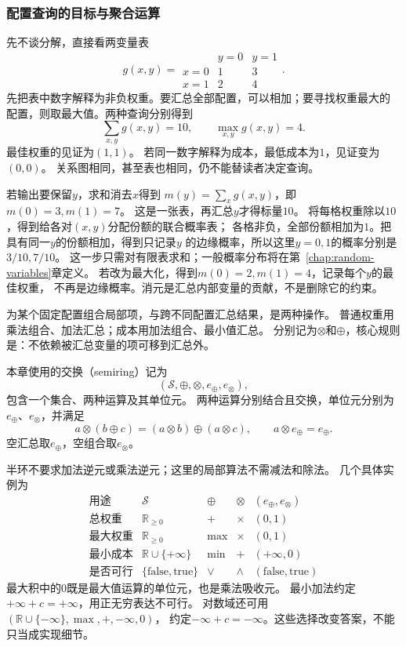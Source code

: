 \subsubsection{配置查询的目标与聚合运算}

先不谈分解，直接看两变量表
\[
  g(x,y)=
  \begin{array}{c|cc}
    &y=0&y=1\\ \hline
    x=0&1&3\\
    x=1&2&4
  \end{array}.
\]
先把表中数字解释为非负权重。要汇总全部配置，可以相加；要寻找权重最大的
配置，则取最大值。两种查询分别得到
\[
  \sum_{x,y}g(x,y)=10,\qquad \max_{x,y}g(x,y)=4.
\]
最佳权重的见证为\((1,1)\)。
若同一数字解释为成本，最低成本为\(1\)，见证变为\((0,0)\)。
关系图相同，甚至表也相同，仍不能替读者决定查询。

若输出要保留\(y\)，求和消去\(x\)得到
\(m(y)=\sum_xg(x,y)\)，即\(m(0)=3,m(1)=7\)。
这是一张表，再汇总\(y\)才得标量\(10\)。
将每格权重除以\(10\)，得到给各对\((x,y)\)分配份额的联合概率表；
各格非负，全部份额相加为\(1\)。把具有同一\(y\)的份额相加，得到只记录\(y\)
的边缘概率，所以这里\(y=0,1\)的概率分别是\(3/10,7/10\)。
这一步只需对有限表求和；一般概率分布将在第~\ref{chap:random-variables}章定义。
若改为最大化，得到\(m(0)=2,m(1)=4\)，记录每个\(y\)的最佳权重，
不再是边缘概率。消元是汇总内部变量的贡献，不是删除它的约束。

为某个固定配置组合局部项，与跨不同配置汇总结果，是两种操作。
普通权重用乘法组合、加法汇总；成本用加法组合、最小值汇总。
分别记为\(\otimes\)和\(\oplus\)，核心规则是：不依赖被汇总变量的项可移到汇总外。

\begin{definition}[交换半环]
  \label{def:graph-theory-semiring}
  本章使用的交换（semiring）记为
  \[
    (\mathcal S,\oplus,\otimes,e_{\oplus},e_{\otimes}),
  \]
  包含一个集合、两种运算及其单位元。
  两种运算分别结合且交换，单位元分别为\(e_{\oplus}\)、\(e_{\otimes}\)，并满足
  \[
    a\otimes(b\oplus c)=(a\otimes b)\oplus(a\otimes c),\qquad
    a\otimes e_{\oplus}=e_{\oplus}.
  \]
  空汇总取\(e_{\oplus}\)，空组合取\(e_{\otimes}\)。
\end{definition}

半环不要求加法逆元或乘法逆元；这里的局部算法不需减法和除法。
几个具体实例为
\[
  \begin{array}{c|c|c|c|c}
    \text{用途}&\mathcal S&\oplus&\otimes&(e_{\oplus},e_{\otimes})\\ \hline
    \text{总权重}&\mathbb R_{\geq0}&+&\times&(0,1)\\
    \text{最大权重}&\mathbb R_{\geq0}&\max&\times&(0,1)\\
    \text{最小成本}&\mathbb R\cup\{+\infty\}&\min&+&(+\infty,0)\\
    \text{是否可行}&\{\mathrm{false},\mathrm{true}\}&\lor&\land&
       (\mathrm{false},\mathrm{true})
  \end{array}
\]
最大积中的\(0\)既是最大值运算的单位元，也是乘法吸收元。
最小加法约定\(+\infty+c=+\infty\)，用正无穷表达不可行。
对数域还可用\((\mathbb R\cup\{-\infty\},\max,+,-\infty,0)\)，
约定\(-\infty+c=-\infty\)。这些选择改变答案，不能只当成实现细节。

